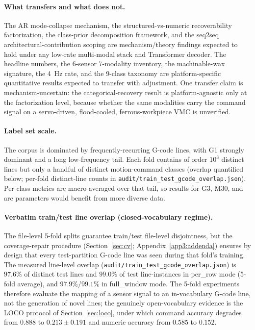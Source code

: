 \documentclass[sensors,article,submit,moreauthors,pdftex]{Definitions/mdpi}
\begin{document}
\paragraph{What transfers and what does not.} The AR mode-collapse mechanism, the structured-vs-numeric recoverability factorization, the class-prior decomposition framework, and the seq2seq architectural-contribution scoping are mechanism/theory findings expected to hold under any low-rate multi-modal stack and Transformer decoder. The headline numbers, the 6-sensor 7-modality inventory, the machinable-wax signature, the 4~Hz rate, and the 9-class taxonomy are platform-specific quantitative results expected to transfer with adjustment. One transfer claim is mechanism-uncertain: the categorical-recovery result is platform-agnostic only at the factorization level, because whether the same modalities carry the command signal on a servo-driven, flood-cooled, ferrous-workpiece VMC is unverified.

\paragraph{Label set scale.} The corpus is dominated by frequently-recurring G-code lines, with G1 strongly dominant and a long low-frequency tail. Each fold contains of order $10^3$ distinct lines but only a handful of distinct motion-command classes (overlap quantified below; per-fold distinct-line counts in \texttt{audit/train\_test\_gcode\_overlap.json}). Per-class metrics are macro-averaged over that tail, so results for G3, M30, and arc parameters would benefit from more diverse data.

\paragraph{Verbatim train/test line overlap (closed-vocabulary regime).} The file-level 5-fold splits guarantee train/test file-level disjointness, but the coverage-repair procedure (Section~\ref{sec:cv}; Appendix~\ref{app3:addenda}) ensures by design that every test-partition G-code line was seen during that fold's training. The measured line-level overlap (\texttt{audit/train\_test\_gcode\_overlap.json}) is $97.6\%$ of distinct test lines and $99.0\%$ of test line-instances in per\_row mode (5-fold average), and $97.9\%$/$99.1\%$ in full\_window mode. The 5-fold experiments therefore evaluate the mapping of a sensor signal to an in-vocabulary G-code line, not the generation of novel lines; the genuinely open-vocabulary evidence is the LOCO protocol of Section~\ref{sec:loco}, under which command accuracy degrades from $0.888$ to $0.213 \pm 0.191$ and numeric accuracy from $0.585$ to $0.152$.
\end{document}

